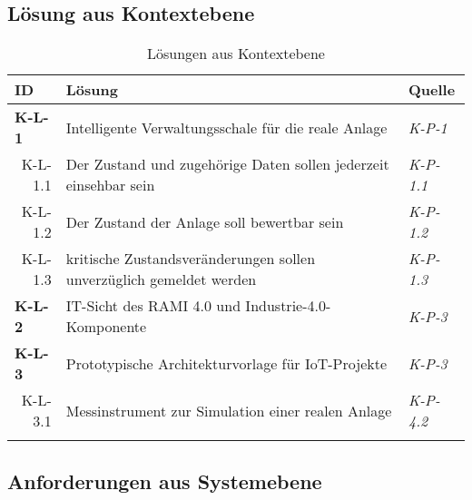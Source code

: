 \subsection{Lösung aus Kontextebene}
\begin{table}[H]
  \begin{tabularx}{\textwidth}{@{}lXp{2cm}@{}}
      \toprule
      ID                & Lösung & Quelle \\
      \midrule
      \textbf{K-L-1}              &   Intelligente Verwaltungsschale für die reale Anlage & \textit{K-P-1}                \\
      \multicolumn{1}{r}{K-L-1.1} &  Der Zustand und zugehörige Daten sollen jederzeit einsehbar sein & \textit{K-P-1.1}\\
      \multicolumn{1}{r}{K-L-1.2} & Der Zustand der Anlage soll bewertbar sein & \textit{K-P-1.2}\\
      \multicolumn{1}{r}{K-L-1.3} & kritische Zustandsveränderungen sollen unverzüglich gemeldet werden & \textit{K-P-1.3}\\
      \textbf{K-L-2}              & IT-Sicht des RAMI 4.0 und Industrie-4.0-Komponente           & \textit{K-P-3}                \\
      \textbf{K-L-3}              &  Prototypische Architekturvorlage für IoT-Projekte & \textit{K-P-3} \\
      \multicolumn{1}{r}{K-L-3.1} &  Messinstrument zur Simulation einer realen Anlage & \textit{K-P-4.2}\\
      \addlinespace
      \bottomrule
  \end{tabularx}
  \label{kontext_losung}
  \caption{Lösungen aus Kontextebene}
\end{table}

\subsection{Anforderungen aus Systemebene} \label{anf_system}

